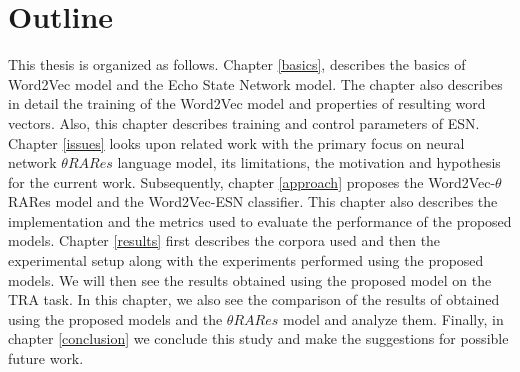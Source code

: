 \section{Outline}

This thesis is organized as follows. Chapter \ref{basics}, describes the basics of Word2Vec model and the Echo State Network model. The chapter also describes in detail the training of the Word2Vec model and properties of resulting word vectors. Also, this chapter describes training and control parameters of ESN. Chapter \ref{issues} looks upon related work with the primary focus on neural network $\theta RARes$ language model, its limitations, the motivation and hypothesis for the current work. Subsequently, chapter \ref{approach} proposes the Word2Vec-$\theta$RARes model and the Word2Vec-ESN classifier. This chapter also describes the implementation and the metrics used to evaluate the performance of the proposed models. Chapter \ref{results} first describes the corpora used and then the experimental setup along with the experiments performed using the proposed models. We will then see the results obtained using the proposed model on the TRA task. In this chapter, we also see the comparison of the results of obtained using the proposed models and the $\theta RARes$ model and analyze them. Finally, in chapter \ref{conclusion} we conclude this study and make the suggestions for  possible future work.